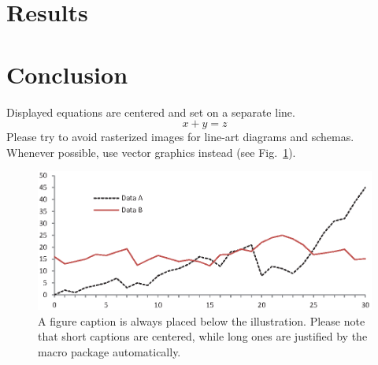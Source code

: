 \documentclass[runningheads]{llncs}
\begin{document}
\section{Results}

\section{Conclusion}


\noindent Displayed equations are centered and set on a separate
line.
\begin{equation}
x + y = z
\end{equation}
Please try to avoid rasterized images for line-art diagrams and
schemas. Whenever possible, use vector graphics instead (see
Fig.~\ref{fig1}).

\begin{figure}
\includegraphics[width=\textwidth]{fig1.eps}
\caption{A figure caption is always placed below the illustration.
Please note that short captions are centered, while long ones are
justified by the macro package automatically.} \label{fig1}
\end{figure}
\end{document}
